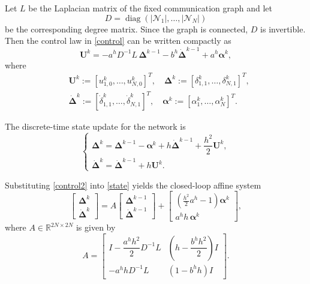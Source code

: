 \documentclass[letterpaper,journal]{IEEEtran}
\begin{document}
Let \(L\) be the Laplacian matrix of the fixed communication graph and let
\[
D=\operatorname{diag}(|\mathcal N_1|,\dots,|\mathcal N_N|)
\]
be the corresponding degree matrix. Since the graph is connected, \(D\) is invertible. Then the control law in \eqref{control} can be written compactly as
\begin{equation}\label{control2}
\bm{U}^k = -a^h D^{-1}L\,\bm{\Delta}^{k-1}
- b^h \dot{\bm{\Delta}}^{k-1}
+ a^h \bm{\alpha}^{k},
\end{equation}
where
\begin{equation}
\begin{aligned}
&\bm{U}^k := [u_{1,0}^k,\dots,u_{N,0}^k]^T,\quad
\bm{\Delta}^k := [\delta_{1,1}^k,\dots,\delta_{N,1}^k]^T,\\
&\dot{\bm{\Delta}}^k := [\dot\delta_{1,1}^k,\dots,\dot\delta_{N,1}^k]^T,\quad
\bm{\alpha}^k := [\alpha_1^k,\dots,\alpha_N^k]^T.
\end{aligned}
\end{equation}

The discrete-time state update for the network is
\begin{equation}\label{state}
\begin{cases}
\bm{\Delta}^{k} = \bm{\Delta}^{k-1}- \bm{\alpha}^{k}
+ h \dot{\bm{\Delta}}^{k-1}
+ \dfrac{h^2}{2} \bm{U}^k,\\[6pt]
\dot{\bm{\Delta}}^{k}  = \dot{\bm{\Delta}}^{k-1}  + h \bm{U}^k.
\end{cases}
\end{equation}

Substituting \eqref{control2} into \eqref{state} yields the closed-loop affine system
\begin{equation}\label{state2}
\begin{bmatrix}
\bm{\Delta}^{k} \\[5pt]
\dot{\bm{\Delta}}^{k}
\end{bmatrix}
=
A
\begin{bmatrix}
\bm{\Delta}^{k-1} \\[5pt]
\dot{\bm{\Delta}}^{k-1}
\end{bmatrix}
+
\begin{bmatrix}
(\tfrac{h^2}{2}a^h-1)\bm{\alpha}^{k} \\[5pt]
a^h h\,\bm{\alpha}^{k}
\end{bmatrix},
\end{equation}
where \(A\in\mathbb{R}^{2N\times 2N}\) is given by
\begin{equation}
A=
\begin{bmatrix}
I - \dfrac{a^{h}h^{2}}{2} D^{-1}L
& \left(h - \dfrac{b^{h}h^{2}}{2}\right) I \\[5pt]
-a^{h}h D^{-1}L
& \left(1- b^{h} h \right) I
\end{bmatrix}.
\end{equation}
\end{document}

